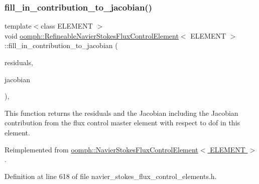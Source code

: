 \subsubsection{\texorpdfstring{fill\+\_\+in\+\_\+contribution\+\_\+to\+\_\+jacobian()}{fill\_in\_contribution\_to\_jacobian()}}
{\footnotesize\ttfamily template$<$class E\+L\+E\+M\+E\+NT $>$ \\
void \hyperlink{classoomph_1_1RefineableNavierStokesFluxControlElement}{oomph\+::\+Refineable\+Navier\+Stokes\+Flux\+Control\+Element}$<$ E\+L\+E\+M\+E\+NT $>$\+::fill\+\_\+in\+\_\+contribution\+\_\+to\+\_\+jacobian (\begin{DoxyParamCaption}\item[{\hyperlink{classoomph_1_1Vector}{Vector}$<$ double $>$ \&}]{residuals,  }\item[{\hyperlink{classoomph_1_1DenseMatrix}{Dense\+Matrix}$<$ double $>$ \&}]{jacobian }\end{DoxyParamCaption})\hspace{0.3cm}{\ttfamily [inline]}, {\ttfamily [virtual]}}



This function returns the residuals and the Jacobian including the Jacobian contribution from the flux control master element with respect to dof in this element. 



Reimplemented from \hyperlink{classoomph_1_1NavierStokesFluxControlElement_a6a745b0b8b1417b7f61782e959c31f69}{oomph\+::\+Navier\+Stokes\+Flux\+Control\+Element$<$ E\+L\+E\+M\+E\+N\+T $>$}.



Definition at line 618 of file navier\+\_\+stokes\+\_\+flux\+\_\+control\+\_\+elements.\+h.

\mbox{\label{classoomph_1_1RefineableNavierStokesFluxControlElement_ad1b969e5a71a212e297ece3a07b9f5cb}} 
